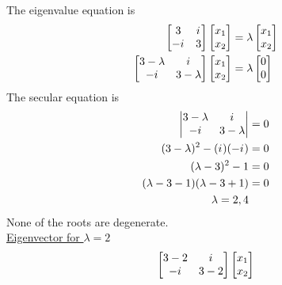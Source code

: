 \begin{enumerate}
	 The eigenvalue equation is
	 \begin{eqnarray}
		 \left[\begin{matrix}
			 3 & {i\mkern1mu} \\ -{i\mkern1mu} & 3
		 \end{matrix}\right]
		 \left[\begin{matrix}
		 x_1 \\ x_2
		 \end{matrix}\right]
		 &= \lambda \left[\begin{matrix}
		 x_1 \\ x_2
		 \end{matrix}\right] \nonumber \\
		 \left[\begin{matrix}
		 3-\lambda & {i\mkern1mu} \\ -{i\mkern1mu} & 3-\lambda
		 \end{matrix}\right]
		 \left[\begin{matrix}
		 x_1 \\ x_2
		 \end{matrix}\right]
		 &= \lambda \left[\begin{matrix}
		 0 \\ 0
		 \end{matrix}\right] 
		 \label{chapter5.eqn1-example2}
	 \end{eqnarray}
	 The secular equation is
	 \begin{eqnarray}
		 \left|\begin{matrix}
		 3-\lambda & {i\mkern1mu} \\ -{i\mkern1mu} & 3-\lambda
		 \end{matrix}\right| &= 0 \nonumber \\
		 (3-\lambda)^2 - ({i\mkern1mu})(-{i\mkern1mu}) &= 0 \nonumber \\
		 (\lambda-3)^2 - 1 &= 0 \nonumber \\
		 (\lambda - 3 - 1)(\lambda - 3 + 1) &= 0 \nonumber \\
		 \lambda = 2,4
	 \end{eqnarray}
	None of the roots are degenerate.\\
	\underline{Eigenvector for $\lambda=2$}
	\begin{eqnarray}
		\left[\begin{matrix}
		3-2 & \iu \\ -\iu & 3-2
		\end{matrix}\right]
		\left[\begin{matrix}
		x_1 \\ x_2
		\end{matrix}\right]

\end{eqnarray}
\end{enumerate}

